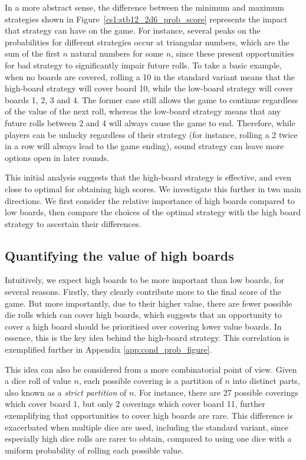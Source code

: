 In a more abstract sense, the difference between the minimum and maximum strategies shown in  Figure~\ref{cs1:stb12_2d6_prob_score} represents the impact that strategy can have on the game. For instance, several peaks on the probabilities for different strategies occur at triangular numbers, which are the sum of the first $n$ natural numbers for some $n$, since these present opportunities for bad strategy to significantly impair future rolls. To take a basic example, when no boards are covered, rolling a 10 in the standard variant means that the high-board strategy will cover board 10, while the low-board strategy will cover boards 1, 2, 3 and 4. The former case still allows the game to continue regardless of the value of the next roll, whereas the low-board strategy means that any future rolls between 2 and 4 will always cause the game to end. Therefore, while players can be unlucky regardless of their strategy (for instance, rolling a 2 twice in a row will always lead to the game ending), sound strategy can leave more options open in later rounds.

This initial analysis suggests that the high-board strategy is effective, and even close to optimal for obtaining high scores. We investigate this further in two main directions. We first consider the relative importance of high boards compared to low boards, then compare the choices of the optimal strategy with the high board strategy to ascertain their differences.

\subsection{Quantifying the value of high boards}

Intuitively, we expect high boards to be more important than low boards, for several reasons. Firstly, they clearly contribute more to the final score of the game. But more importantly, due to their higher value, there are fewer possible die rolls which can cover high boards, which suggests that an opportunity to cover a high board should be prioritised over covering lower value boards. In essence, this is the key idea behind the high-board strategy. This correlation is exemplified further in Appendix \ref{app:cond_prob_figure}.

This idea can also be considered from a more combinatorial point of view. Given a dice roll of value $n$, each possible covering is a partition of $n$ into distinct parts, also known as a \emph{strict partition} of $n$. For instance, there are 27 possible coverings which cover board 1, but only 2 coverings which cover board 11, further exemplifying that opportunities to cover high boards are rare. This difference is exacerbated when multiple dice are used, including the standard variant, since especially high dice rolls are rarer to obtain, compared to using one dice with a uniform probability of rolling each possible value.

